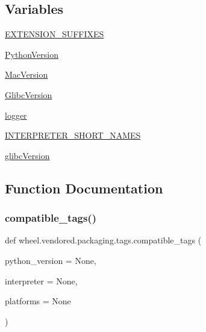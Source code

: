 \subsection*{Variables}
\begin{DoxyCompactItemize}
\item 
\hyperlink{namespacewheel_1_1vendored_1_1packaging_1_1tags_a56fe435135f96020e683c429da949861}{E\+X\+T\+E\+N\+S\+I\+O\+N\+\_\+\+S\+U\+F\+F\+I\+X\+ES}
\item 
\hyperlink{namespacewheel_1_1vendored_1_1packaging_1_1tags_adfc372937a92b59eaff3e5ad36d2f418}{Python\+Version}
\item 
\hyperlink{namespacewheel_1_1vendored_1_1packaging_1_1tags_a35e9532ad90e36436f05b1dbf15d7b1e}{Mac\+Version}
\item 
\hyperlink{namespacewheel_1_1vendored_1_1packaging_1_1tags_ad848e4c57ba3230c8811283619a523af}{Glibc\+Version}
\item 
\hyperlink{namespacewheel_1_1vendored_1_1packaging_1_1tags_acbf923db2c0713798fa898d5d44fac92}{logger}
\item 
\hyperlink{namespacewheel_1_1vendored_1_1packaging_1_1tags_ae711b252afcd70aea0c75a0d861a0171}{I\+N\+T\+E\+R\+P\+R\+E\+T\+E\+R\+\_\+\+S\+H\+O\+R\+T\+\_\+\+N\+A\+M\+ES}
\item 
\hyperlink{namespacewheel_1_1vendored_1_1packaging_1_1tags_a78a50add06a0d8861d202e7bd0c9538d}{glibc\+Version}
\end{DoxyCompactItemize}


\subsection{Function Documentation}
\mbox{\label{namespacewheel_1_1vendored_1_1packaging_1_1tags_aace61eef4bc25ac7347c068de81df95d}} 
\subsubsection{\texorpdfstring{compatible\+\_\+tags()}{compatible\_tags()}}
{\footnotesize\ttfamily def wheel.\+vendored.\+packaging.\+tags.\+compatible\+\_\+tags (\begin{DoxyParamCaption}\item[{}]{python\+\_\+version = {\ttfamily None},  }\item[{}]{interpreter = {\ttfamily None},  }\item[{}]{platforms = {\ttfamily None} }\end{DoxyParamCaption})}

